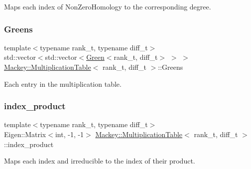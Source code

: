 Maps each index of Non\+Zero\+Homology to the corresponding degree. 

\mbox{\label{classMackey_1_1MultiplicationTable_ac9a42c7d9c520844c0d1c91051ae750e}} 
\subsubsection{\texorpdfstring{Greens}{Greens}}
{\footnotesize\ttfamily template$<$typename rank\+\_\+t, typename diff\+\_\+t$>$ \\
std\+::vector$<$std\+::vector$<$\hyperlink{classMackey_1_1Green}{Green}$<$rank\+\_\+t, diff\+\_\+t$>$ $>$ $>$ \hyperlink{classMackey_1_1MultiplicationTable}{Mackey\+::\+Multiplication\+Table}$<$ rank\+\_\+t, diff\+\_\+t $>$\+::Greens\hspace{0.3cm}{\ttfamily [protected]}}



Each entry in the multiplication table. 

\mbox{\label{classMackey_1_1MultiplicationTable_a83a89961f82ad9fd2b1ae41b912ef434}} 
\subsubsection{\texorpdfstring{index\+\_\+product}{index\_product}}
{\footnotesize\ttfamily template$<$typename rank\+\_\+t, typename diff\+\_\+t$>$ \\
Eigen\+::\+Matrix$<$int, -\/1, -\/1$>$ \hyperlink{classMackey_1_1MultiplicationTable}{Mackey\+::\+Multiplication\+Table}$<$ rank\+\_\+t, diff\+\_\+t $>$\+::index\+\_\+product\hspace{0.3cm}{\ttfamily [protected]}}



Maps each index and irreducible to the index of their product. 

\mbox{\label{classMackey_1_1MultiplicationTable_ad5a05c126e0b3c769fa9b1196a8db96a}} 
